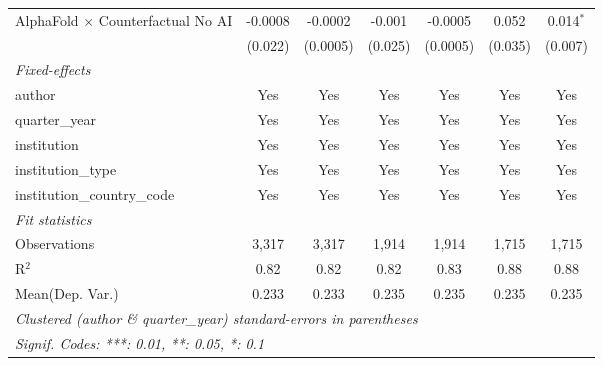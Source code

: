 \begin{tabular}{lcccccc}
   AlphaFold $\times$ Counterfactual No AI  & -0.0008 & -0.0002      & -0.001  & -0.0005      & 0.052   & 0.014$^{*}$\\   
                                            & (0.022) & (0.0005)     & (0.025) & (0.0005)     & (0.035) & (0.007)\\   
   \midrule
   \emph{Fixed-effects}\\
   author                                   & Yes     & Yes          & Yes     & Yes          & Yes     & Yes\\  
   quarter\_year                            & Yes     & Yes          & Yes     & Yes          & Yes     & Yes\\  
   institution                              & Yes     & Yes          & Yes     & Yes          & Yes     & Yes\\  
   institution\_type                        & Yes     & Yes          & Yes     & Yes          & Yes     & Yes\\  
   institution\_country\_code               & Yes     & Yes          & Yes     & Yes          & Yes     & Yes\\  
   \midrule
   \emph{Fit statistics}\\
   Observations                             & 3,317   & 3,317        & 1,914   & 1,914        & 1,715   & 1,715\\  
   R$^2$                                    & 0.82    & 0.82         & 0.82    & 0.83         & 0.88    & 0.88\\  
Mean(Dep. Var.) & 0.233 & 0.233 & 0.235 & 0.235 & 0.235 & 0.235 \\
   \midrule \midrule
   \multicolumn{7}{l}{\emph{Clustered (author \& quarter\_year) standard-errors in parentheses}}\\
   \multicolumn{7}{l}{\emph{Signif. Codes: ***: 0.01, **: 0.05, *: 0.1}}\\
\end{tabular}
\par\endgroup

